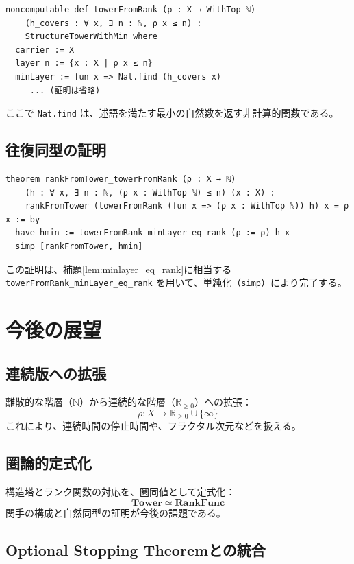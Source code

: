 \documentclass[a4paper,11pt]{ltjsarticle}
\theoremstyle{definition}
\begin{document}
\begin{lstlisting}
noncomputable def towerFromRank (ρ : X → WithTop ℕ)
    (h_covers : ∀ x, ∃ n : ℕ, ρ x ≤ n) :
    StructureTowerWithMin where
  carrier := X
  layer n := {x : X | ρ x ≤ n}
  minLayer := fun x => Nat.find (h_covers x)
  -- ... (証明は省略)
\end{lstlisting}

ここで \texttt{Nat.find} は、述語を満たす最小の自然数を返す非計算的関数である。

\subsection{往復同型の証明}

\begin{lstlisting}
theorem rankFromTower_towerFromRank (ρ : X → ℕ)
    (h : ∀ x, ∃ n : ℕ, (ρ x : WithTop ℕ) ≤ n) (x : X) :
    rankFromTower (towerFromRank (fun x => (ρ x : WithTop ℕ)) h) x = ρ x := by
  have hmin := towerFromRank_minLayer_eq_rank (ρ := ρ) h x
  simp [rankFromTower, hmin]
\end{lstlisting}

この証明は、補題\ref{lem:minlayer_eq_rank}に相当する \texttt{towerFromRank\_minLayer\_eq\_rank} を用いて、単純化（\texttt{simp}）により完了する。

\section{今後の展望}

\subsection{連続版への拡張}

離散的な階層（$\mathbb{N}$）から連続的な階層（$\mathbb{R}_{\geq 0}$）への拡張：
\[
\rho : X \to \mathbb{R}_{\geq 0} \cup \{\infty\}
\]
これにより、連続時間の停止時間や、フラクタル次元などを扱える。

\subsection{圏論的定式化}

構造塔とランク関数の対応を、圏同値として定式化：
\[
\mathbf{Tower} \simeq \mathbf{RankFunc}
\]
関手の構成と自然同型の証明が今後の課題である。

\subsection{Optional Stopping Theoremとの統合}
\end{document}
